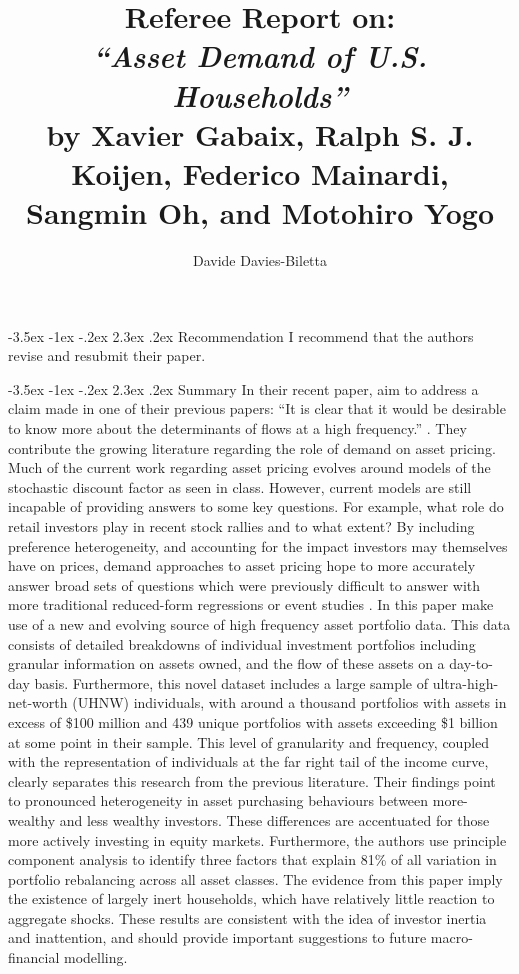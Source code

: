\documentclass[]{article}
\title{Referee Report on:\\
	 \textit{``Asset Demand of U.S. Households''}\\
	 \bb
	  \large{by Xavier Gabaix, Ralph S. J. Koijen, Federico Mainardi, Sangmin Oh, and Motohiro Yogo}}
\author{Davide Davies-Biletta}
\makeatletter
\renewcommand\section{\leftskip 0pt\@startsection {section}{1}{\z@}%
	{-3.5ex \@plus -1ex \@minus -.2ex}%
	{2.3ex \@plus.2ex}%
	{\normalfont\Large\bfseries}}
\makeatother
\begin{document}
\vspace{50ex}

\maketitle
\thispagestyle{empty}
\pagebreak
{}
\begin{spacing}{1.1}
\section{Recommendation}
I recommend that the authors revise and resubmit their paper.

\section{Summary}
In their recent paper, \cite{gabaix2024asset} aim to address a claim made in one of their previous papers: ``It is clear that it would be desirable to know more about the determinants of flows at a high frequency.'' \parencite{gabaix2021search}. They contribute the growing literature regarding the role of demand on asset pricing. Much of the current work regarding asset pricing evolves around models of the stochastic discount factor as seen in class. However, current models are still incapable of providing answers to some key questions. For example, what role do retail investors play in recent stock rallies and to what extent? By including preference heterogeneity, and accounting for the impact investors may themselves have on prices, demand approaches to asset pricing hope to more accurately answer broad sets of questions which were previously difficult to answer with more traditional reduced-form regressions or event studies \parencite{koijen2019demand}. In this paper \cite{gabaix2024asset} make use of a new and evolving source of high frequency asset portfolio data. This data consists of detailed breakdowns of individual investment portfolios including granular information on assets owned, and the flow of these assets on a day-to-day basis. Furthermore, this novel dataset includes a large sample of ultra-high-net-worth (UHNW) individuals, with around a thousand portfolios with assets in excess of \$100 million and 439 unique portfolios with assets exceeding \$1 billion at some point in their sample. This level of granularity and frequency, coupled with the representation of individuals at the far right tail of the income curve, clearly separates this research from the previous literature.  
Their findings point to pronounced heterogeneity in asset purchasing behaviours between more-wealthy and less wealthy investors. These differences are accentuated for those more actively investing in equity markets. Furthermore, the authors use principle component analysis to identify three factors that explain 81\% of all variation in portfolio rebalancing across all asset classes. The evidence from this paper imply the existence of largely inert households, which have relatively little reaction to aggregate shocks. These results are consistent with the idea of investor inertia and inattention, and should provide important suggestions to future macro-financial modelling. 



\end{spacing}
\end{document}
